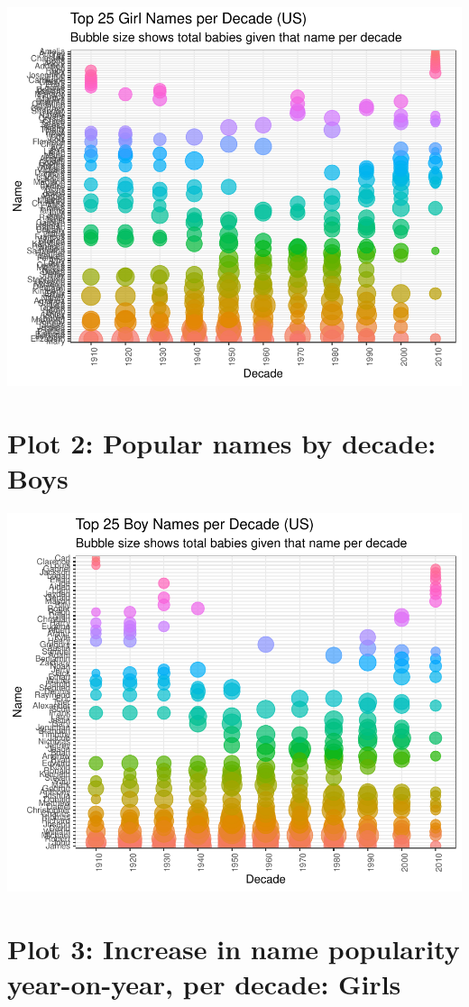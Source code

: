 \documentclass[11pt,preprint]{elsarticle}
\numberwithin{equation}{section}
\numberwithin{figure}{section}
\numberwithin{table}{section}
\begin{document}
\includegraphics{Question1_files/figure-latex/unnamed-chunk-1-1.pdf}

\section{Plot 2: Popular names by decade:
Boys}\label{plot-2-popular-names-by-decade-boys}

\includegraphics{Question1_files/figure-latex/unnamed-chunk-2-1.pdf}

\section{Plot 3: Increase in name popularity year-on-year, per decade:
Girls}\label{plot-3-increase-in-name-popularity-year-on-year-per-decade-girls}
\end{document}
